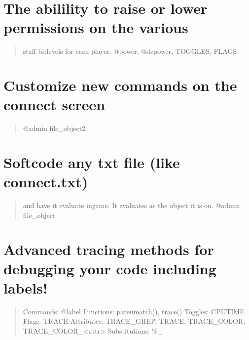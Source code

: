 \documentclass[letterpaper,10pt,english]{sphinxmanual}
\begin{document}
\section{The abilility to raise or lower permissions on the various}
\label{\detokenize{01-intro:the-abilility-to-raise-or-lower-permissions-on-the-various}}\begin{quote}

\sphinxAtStartPar
staff bitlevels for each player.
@power, @depower, TOGGLES, FLAGS
\end{quote}


\section{Customize new commands on the connect screen}
\label{\detokenize{01-intro:customize-new-commands-on-the-connect-screen}}\begin{quote}

\sphinxAtStartPar
@admin file\_object2
\end{quote}


\section{Softcode any txt file (like connect.txt)}
\label{\detokenize{01-intro:softcode-any-txt-file-like-connect-txt}}\begin{quote}

\sphinxAtStartPar
and have it evaluate in\sphinxhyphen{}game.  It evaluates as the object
it is on.
@admin file\_object
\end{quote}


\section{Advanced tracing methods for debugging your code including labels!}
\label{\detokenize{01-intro:advanced-tracing-methods-for-debugging-your-code-including-labels}}\begin{quote}

\sphinxAtStartPar
Commands: @label
Functions: parenmatch(), trace()
Toggles: CPUTIME
Flags: TRACE
Attributes: TRACE\_GREP, TRACE, TRACE\_COLOR, TRACE\_COLOR\_\textless{}attr\textgreater{}
Substitutions: \%\_
\end{quote}
\end{document}
